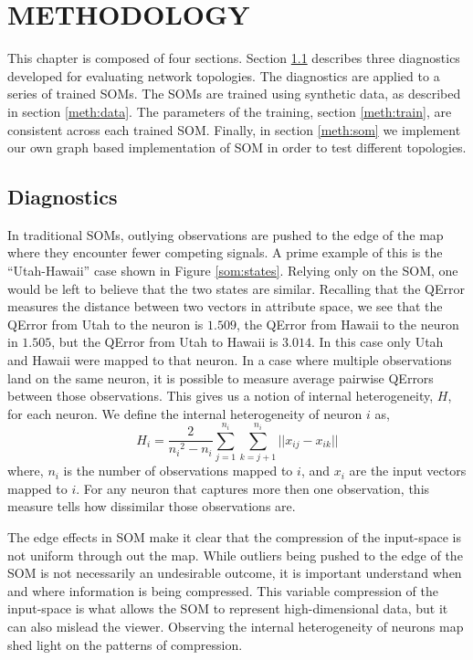 \chapter{METHODOLOGY}
This chapter is composed of four sections.  Section \ref{meth:diag} describes
three diagnostics developed for evaluating network topologies.  The
diagnostics are applied to a series of trained SOMs.  The SOMs are trained
using synthetic data, as described in section \ref{meth:data}. The
parameters of the training, section \ref{meth:train}, are consistent across
each trained SOM. Finally, in section \ref{meth:som} we implement our own
graph based implementation of SOM in order to test different topologies.

\section{Diagnostics}
\label{meth:diag}

In traditional SOMs, outlying observations are pushed to the edge of the map
where they encounter fewer competing signals.  A prime example of this is the
``Utah-Hawaii'' case shown in Figure \ref{som:states}.  Relying only on the
SOM, one would be left to believe that the two states are similar.  Recalling
that the QError measures the distance between two vectors in attribute space,
we see that the QError from Utah to the neuron is $1.509$, the QError from
Hawaii to the neuron in $1.505$, but the QError from Utah to Hawaii is
$3.014$. In this case only Utah and Hawaii were mapped to that neuron.  In a
case where multiple observations land on the same neuron, it is possible to
measure average pairwise QErrors between those observations.  This gives us a
notion of internal heterogeneity, \(H\), for each neuron.  We define the
internal heterogeneity of neuron \(i\) as,
 \begin{equation}
   {H_i} = \frac{2}{{n_i}^2-{n_i}}\sum_{j=1}^{n_i}\sum_{k=j+1}^{n_i} ||{x_{ij}}-{x_{ik}}||
 \label{eqno1}
 \end{equation}
where, \(n_i\) is the number of observations mapped to \(i\), and \(x_i\) are
the input vectors mapped to \(i\).  For any neuron that captures more then one
observation, this measure tells how dissimilar those observations are.

The edge effects in SOM make it clear that the compression of the input-space is
not uniform through out the map.  While outliers being pushed to the edge of
the SOM is not necessarily an undesirable outcome, it is important understand
when and where information is being compressed.  This variable compression of
the input-space is what allows the SOM to represent high-dimensional data, but
it can also mislead the viewer.  Observing the internal heterogeneity of
neurons map shed light on the patterns of compression.

